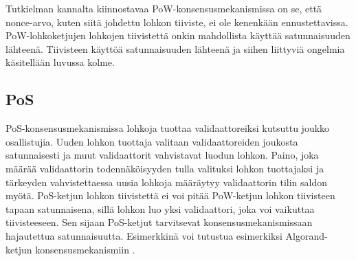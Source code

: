 Tutkielman kannalta kiinnostavaa PoW-konsensusmekanismissa on se, että nonce-arvo, kuten siitä johdettu lohkon tiiviste, ei ole kenenkään ennustettavissa. PoW-lohkoketjujen lohkojen tiivistettä onkin mahdollista käyttää satunnaisuuden lähteenä. Tiivisteen käyttöä satunnaisuuden lähteenä ja siihen liittyviä ongelmia käsitellään luvussa kolme.

\subsection{PoS}

PoS-konsensusmekanismissa lohkoja tuottaa validaattoreiksi kutsuttu joukko osallistujia. Uuden lohkon tuottaja valitaan validaattoreiden joukosta satunnaisesti ja muut validaattorit vahvistavat luodun lohkon. Paino, joka määrää validaattorin todennäköisyyden tulla valituksi lohkon tuottajaksi ja tärkeyden vahvistettaessa uusia lohkoja määräytyy validaattorin tilin saldon myötä. PoS-ketjun lohkon tiivistettä ei voi pitää PoW-ketjun lohkon tiivisteen tapaan satunnaisena, sillä lohkon luo yksi validaattori, joka voi vaikuttaa tiivisteeseen. Sen sijaan PoS-ketjut tarvitsevat konsensusmekanismissaan hajautettua satunnaisuutta. Esimerkkinä voi tutustua esimerkiksi Algorand-ketjun konsensusmekanismiin \cite{gilad_algorand_2017}.


